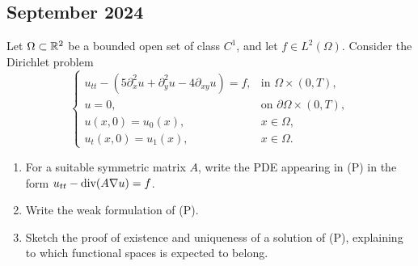 \subsection{September 2024}
\begin{exercise}
    Let \(\Omega \subset \mathbb{R}^2\) be a bounded open set of class \(C^1\), and let \(f \in L^2(\Omega)\). Consider the Dirichlet problem
    \begin{equation*}
        \begin{cases}
            u_{tt} - \left(5\partial_x^2 u +  \partial_y^2 u - 4 \partial_{xy} u\right) = f, & \text{in } \Omega \times (0, T),          \\
            u = 0,                                                                           & \text{on } \partial \Omega \times (0, T), \\
            u(x,0) = u_0(x),                                                                 & x \in \Omega,                             \\
            u_t(x,0) = u_1(x),                                                               & x \in \Omega.
        \end{cases}
        \tag{(P)}
    \end{equation*}
    \begin{enumerate}
        \item For a suitable symmetric matrix \(A\), write the PDE appearing in (P) in the
              form \(u_{tt} - \text{div}(A \nabla u) = f\).
        \item Write the weak formulation of (P).
        \item Sketch the proof of existence and uniqueness of a solution of (P), explaining
              to which functional spaces is expected to belong.
    \end{enumerate}
\end{exercise}
